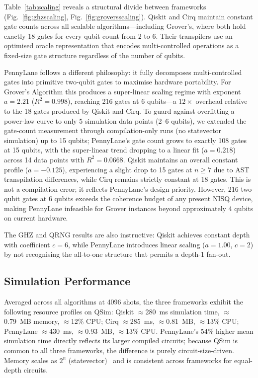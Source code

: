 Table~\ref{tab:scaling} reveals a structural divide between frameworks
(Fig.~\ref{fig:ghzscaling}, Fig.~\ref{fig:groversscaling}).
Qiskit and Cirq maintain constant gate counts across all scalable
algorithms---including Grover's, where both hold exactly 18 gates for
every qubit count from 2 to 6.
Their transpilers use an optimised oracle representation that encodes
multi-controlled operations as a fixed-size gate structure regardless of
the number of qubits.

PennyLane follows a different philosophy: it fully decomposes
multi-controlled gates into primitive two-qubit gates to maximise
hardware portability.
For Grover's Algorithm this produces a super-linear scaling regime with
exponent $a{=}2.21$ ($R^2{=}0.998$), reaching 216 gates at 6 qubits---a
$12\times$ overhead relative to the 18 gates produced by Qiskit and Cirq.
To guard against overfitting a power-law curve to only 5 simulation data
points (2--6 qubits), we extended the gate-count measurement through
compilation-only runs (no statevector simulation) up to 15 qubits;
PennyLane's gate count grows to exactly 108 gates at 15 qubits,
with the super-linear trend dropping to a linear fit ($a{=}0.218$)
across 14 data points with $R^2 = 0.0668$. Qiskit maintains an overall
constant profile ($a{=}-0.125$), experiencing a slight drop to 15 gates
at $n \ge 7$ due to AST transpilation differences, while Cirq remains
strictly constant at 18 gates.
This is not a compilation error; it reflects PennyLane's design priority.
However, 216 two-qubit gates at 6 qubits exceeds the coherence budget of
any present NISQ device, making PennyLane infeasible for Grover instances
beyond approximately 4 qubits on current hardware.

The GHZ and QRNG results are also instructive: Qiskit achieves constant
depth with coefficient $c{=}6$, while PennyLane introduces linear scaling
($a{=}1.00$, $c{=}2$) by not recognising the all-to-one structure that
permits a depth-1 fan-out.

\subsection{Simulation Performance}
\label{sec:simperf}

Averaged across all algorithms at 4096 shots, the three frameworks
exhibit the following resource profiles on QSim:
Qiskit $\approx$280~ms simulation time, $\approx$0.79~MB memory,
$\approx$12\% CPU;
Cirq $\approx$285~ms, $\approx$0.81~MB, $\approx$13\% CPU;
PennyLane $\approx$430~ms, $\approx$0.93~MB, $\approx$13\% CPU.
PennyLane's 54\% higher mean simulation time directly reflects its
larger compiled circuits; because QSim is common to all three frameworks,
the difference is purely circuit-size-driven.
Memory scales as $2^n$ (statevector)~\cite{nielsen2010quantum,%
villalonga2019flexible} and is consistent across frameworks for
equal-depth circuits.

